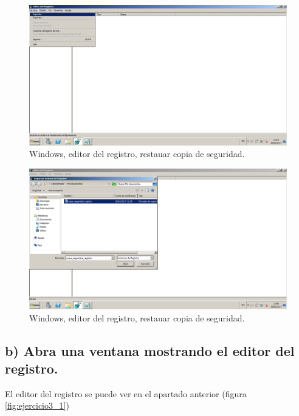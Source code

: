 \begin{figure}[H] 
	\centering
	\includegraphics[width=14.7cm]{./img/ejercicio3_3.png} 	
	\caption{Windows, editor del registro, restauar copia de seguridad.} \label{fig:ejercicio3_3}
\end{figure}

\begin{figure}[H] 
	\centering
	\includegraphics[width=14.7cm]{./img/ejercicio3_4.png} 	
	\caption{Windows, editor del registro, restauar copia de seguridad.} \label{fig:ejercicio3_4}
\end{figure}


\subsection{b) Abra una ventana mostrando el editor del registro.}
El editor del registro se puede ver en el apartado anterior (figura \ref{fig:ejercicio3_1})





